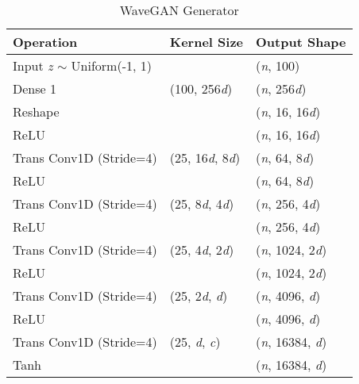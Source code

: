 \documentclass[a4paper, dvipsnames, titlepage]{article}
\begin{document}
\begin{appendices}
\begin{table}[h]
\begin{center}
\begin{tabular}{ l | l | l}
      \end{tabular}
    \end{center}
    
  \end{table}

  \begin{table}[h]
    
    \caption{WaveGAN Generator}
    \label{tab:Gen}
    
    \begin{center}
      \begin{tabular}{ l | l | l}
        
        Operation & Kernel Size & Output Shape \\
        \hline
        Input {\it z} $\sim$ Uniform(-1, 1) & & ({\it n}, 100) \\
        Dense 1 & (100, 256{\it d}) & ({\it n}, 256{\it d}) \\
        Reshape & & ({\it n}, 16, 16{\it d}) \\
        ReLU & & ({\it n}, 16, 16{\it d}) \\
        Trans Conv1D (Stride=4) & (25, 16{\it d}, 8{\it d}) & ({\it n}, 64, 8{\it d}) \\
        ReLU & & ({\it n}, 64, 8{\it d}) \\
        Trans Conv1D (Stride=4) & (25, 8{\it d}, 4{\it d}) & ({\it n}, 256, 4{\it d}) \\
        ReLU & & ({\it n}, 256, 4{\it d}) \\
        Trans Conv1D (Stride=4) & (25, 4{\it d}, 2{\it d}) & ({\it n}, 1024, 2{\it d}) \\
        ReLU & & ({\it n}, 1024, 2{\it d}) \\
        Trans Conv1D (Stride=4) & (25, 2{\it d}, {\it d}) & ({\it n}, 4096, {\it d}) \\
        ReLU & & ({\it n}, 4096, {\it d}) \\
        Trans Conv1D (Stride=4) & (25, {\it d}, {\it c}) & ({\it n}, 16384, {\it d}) \\
        Tanh & & ({\it n}, 16384, {\it d}) \\

      \end{tabular}
    \end{center}
    
  \end{table}

\end{appendices}

\end{document}
